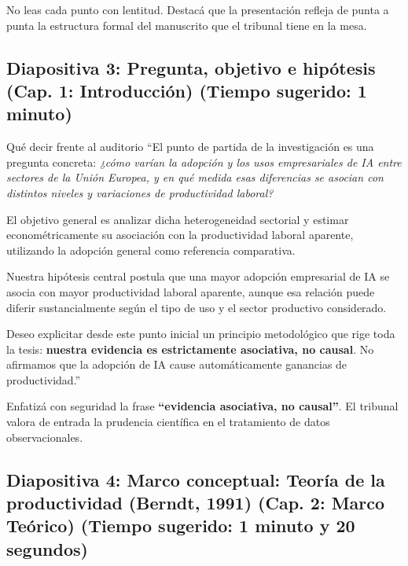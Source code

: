 \documentclass[11pt,a4paper]{article}
\begin{document}
\begin{tipbox}
No leas cada punto con lentitud. Destacá que la presentación refleja de punta a punta la estructura formal del manuscrito que el tribunal tiene en la mesa.
\end{tipbox}

\subsection*{Diapositiva 3: Pregunta, objetivo e hipótesis (Cap. 1: Introducción) (Tiempo sugerido: 1 minuto)}

\begin{speechbox}{Qué decir frente al auditorio}
``El punto de partida de la investigación es una pregunta concreta: \textit{¿cómo varían la adopción y los usos empresariales de IA entre sectores de la Unión Europea, y en qué medida esas diferencias se asocian con distintos niveles y variaciones de productividad laboral?}

El objetivo general es analizar dicha heterogeneidad sectorial y estimar econométricamente su asociación con la productividad laboral aparente, utilizando la adopción general como referencia comparativa.

Nuestra hipótesis central postula que una mayor adopción empresarial de IA se asocia con mayor productividad laboral aparente, aunque esa relación puede diferir sustancialmente según el tipo de uso y el sector productivo considerado.

Deseo explicitar desde este punto inicial un principio metodológico que rige toda la tesis: \textbf{nuestra evidencia es estrictamente asociativa, no causal}. No afirmamos que la adopción de IA cause automáticamente ganancias de productividad.''
\end{speechbox}

\begin{tipbox}
Enfatizá con seguridad la frase \textbf{``evidencia asociativa, no causal''}. El tribunal valora de entrada la prudencia científica en el tratamiento de datos observacionales.
\end{tipbox}

\subsection*{Diapositiva 4: Marco conceptual: Teoría de la productividad (Berndt, 1991) (Cap. 2: Marco Teórico) (Tiempo sugerido: 1 minuto y 20 segundos)}
\end{document}
